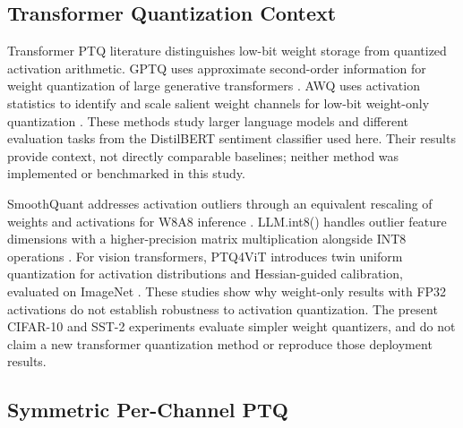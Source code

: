 \documentclass[conference]{IEEEtran}
\begin{document}
\subsection{Transformer Quantization Context}

Transformer PTQ literature distinguishes low-bit weight storage from quantized activation arithmetic. GPTQ uses approximate second-order information for weight quantization of large generative transformers \cite{frantar2022}. AWQ uses activation statistics to identify and scale salient weight channels for low-bit weight-only quantization \cite{lin2023}. These methods study larger language models and different evaluation tasks from the DistilBERT sentiment classifier used here. Their results provide context, not directly comparable baselines; neither method was implemented or benchmarked in this study.

SmoothQuant addresses activation outliers through an equivalent rescaling of weights and activations for W8A8 inference \cite{xiao2022}. LLM.int8() handles outlier feature dimensions with a higher-precision matrix multiplication alongside INT8 operations \cite{dettmers2022}. For vision transformers, PTQ4ViT introduces twin uniform quantization for activation distributions and Hessian-guided calibration, evaluated on ImageNet \cite{yuan2021}. These studies show why weight-only results with FP32 activations do not establish robustness to activation quantization. The present CIFAR-10 and SST-2 experiments evaluate simpler weight quantizers, and do not claim a new transformer quantization method or reproduce those deployment results.

\subsection{Symmetric Per-Channel PTQ}
\end{document}

